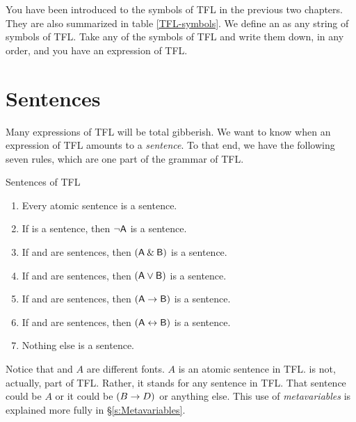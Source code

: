 You have been introduced to the symbols of TFL in the previous two chapters. They are also summarized in table \ref{TFL-symbols}. We define an  as any string of symbols of TFL. Take any of the symbols of TFL and write them down, in any order, and you have an expression of TFL.


\section{Sentences}\label{s:Sentences}
Many expressions of TFL will be total gibberish. We want to know when an expression of TFL amounts to a \emph{sentence}. To that end, we have the following seven rules, which are one part of the grammar of TFL.




\begin{factboxy}{Sentences of TFL}\label{TFLsentences}
	\begin{enumerate}
		\item Every atomic sentence is a sentence.
		\item If  is a sentence, then ${\neg}\mathsf{A}$ is a sentence.
		\item If  and  are sentences, then $(\mathsf{A}\mathbin{\&}\mathsf{B})$ is a sentence.
		\item If  and  are sentences, then $(\mathsf{A}\vee\mathsf{B})$ is a sentence.
		\item If  and  are sentences, then $(\mathsf{A}\rightarrow\mathsf{B})$ is a sentence.
		\item If  and  are sentences, then $(\mathsf{A}\leftrightarrow\mathsf{B})$ is a sentence.
		\item Nothing else is a sentence.
	\end{enumerate}
\tcblower
\footnotesize{Notice that  and $A$ are different fonts. $A$ is an atomic sentence in TFL.  is not, actually, part of TFL. Rather, it stands for any sentence in TFL. That sentence could be $A$ or it could be $(B \rightarrow D)$ or anything else. This use of \textit{metavariables} is explained more fully in \S\ref{s:Metavariables}.}
\end{factboxy}

